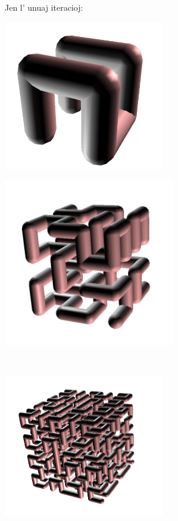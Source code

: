 Jen l' unuaj iteracioj:
\begin{center}
\begin{minipage}{7cm}
 \includegraphics[width=7cm]{bildoj/linden-hilbert1.png}
\end{minipage}
\begin{minipage}{7cm}
 \includegraphics[width=7.5cm]{bildoj/linden-hilbert2.png}
\end{minipage}\\
\begin{minipage}{7cm}
 \includegraphics[width=7cm]{bildoj/linden-hilbert3.png}
\end{minipage}
\begin{minipage}{7cm}

\end{minipage}
\end{center}
